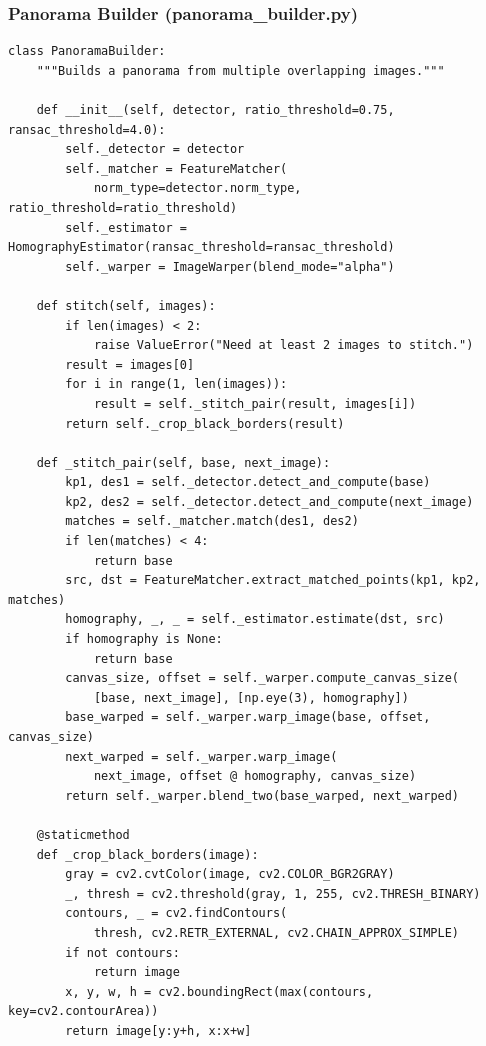\documentclass[a4paper,12pt]{article}
\begin{document}
\subsubsection*{Panorama Builder (panorama\_builder.py)}
\begin{lstlisting}
class PanoramaBuilder:
    """Builds a panorama from multiple overlapping images."""

    def __init__(self, detector, ratio_threshold=0.75, ransac_threshold=4.0):
        self._detector = detector
        self._matcher = FeatureMatcher(
            norm_type=detector.norm_type, ratio_threshold=ratio_threshold)
        self._estimator = HomographyEstimator(ransac_threshold=ransac_threshold)
        self._warper = ImageWarper(blend_mode="alpha")

    def stitch(self, images):
        if len(images) < 2:
            raise ValueError("Need at least 2 images to stitch.")
        result = images[0]
        for i in range(1, len(images)):
            result = self._stitch_pair(result, images[i])
        return self._crop_black_borders(result)

    def _stitch_pair(self, base, next_image):
        kp1, des1 = self._detector.detect_and_compute(base)
        kp2, des2 = self._detector.detect_and_compute(next_image)
        matches = self._matcher.match(des1, des2)
        if len(matches) < 4:
            return base
        src, dst = FeatureMatcher.extract_matched_points(kp1, kp2, matches)
        homography, _, _ = self._estimator.estimate(dst, src)
        if homography is None:
            return base
        canvas_size, offset = self._warper.compute_canvas_size(
            [base, next_image], [np.eye(3), homography])
        base_warped = self._warper.warp_image(base, offset, canvas_size)
        next_warped = self._warper.warp_image(
            next_image, offset @ homography, canvas_size)
        return self._warper.blend_two(base_warped, next_warped)

    @staticmethod
    def _crop_black_borders(image):
        gray = cv2.cvtColor(image, cv2.COLOR_BGR2GRAY)
        _, thresh = cv2.threshold(gray, 1, 255, cv2.THRESH_BINARY)
        contours, _ = cv2.findContours(
            thresh, cv2.RETR_EXTERNAL, cv2.CHAIN_APPROX_SIMPLE)
        if not contours:
            return image
        x, y, w, h = cv2.boundingRect(max(contours, key=cv2.contourArea))
        return image[y:y+h, x:x+w]
\end{lstlisting}
\end{document}
